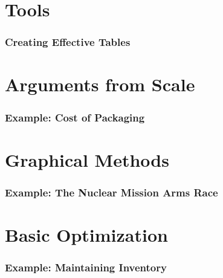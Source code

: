 \documentclass[compress,handout,10pt]{beamer}
\begin{document}
\section{Tools}
\begin{frame}
    \frametitle{Creating Effective Tables}
\end{frame}

\section{Arguments from Scale}

\begin{frame}
    \frametitle{Example: Cost of Packaging}
\end{frame}

\section{Graphical Methods}
\begin{frame}
    \frametitle{Example: The Nuclear Mission Arms Race}
\end{frame}

\section{Basic Optimization}
\begin{frame}
    \frametitle{Example: Maintaining Inventory}
\end{frame}
\end{document}
